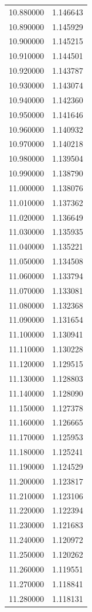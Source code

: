 \begin{tabular}{rr}
10.880000 & 1.146643 \\
10.890000 & 1.145929 \\
10.900000 & 1.145215 \\
10.910000 & 1.144501 \\
10.920000 & 1.143787 \\
10.930000 & 1.143074 \\
10.940000 & 1.142360 \\
10.950000 & 1.141646 \\
10.960000 & 1.140932 \\
10.970000 & 1.140218 \\
10.980000 & 1.139504 \\
10.990000 & 1.138790 \\
11.000000 & 1.138076 \\
11.010000 & 1.137362 \\
11.020000 & 1.136649 \\
11.030000 & 1.135935 \\
11.040000 & 1.135221 \\
11.050000 & 1.134508 \\
11.060000 & 1.133794 \\
11.070000 & 1.133081 \\
11.080000 & 1.132368 \\
11.090000 & 1.131654 \\
11.100000 & 1.130941 \\
11.110000 & 1.130228 \\
11.120000 & 1.129515 \\
11.130000 & 1.128803 \\
11.140000 & 1.128090 \\
11.150000 & 1.127378 \\
11.160000 & 1.126665 \\
11.170000 & 1.125953 \\
11.180000 & 1.125241 \\
11.190000 & 1.124529 \\
11.200000 & 1.123817 \\
11.210000 & 1.123106 \\
11.220000 & 1.122394 \\
11.230000 & 1.121683 \\
11.240000 & 1.120972 \\
11.250000 & 1.120262 \\
11.260000 & 1.119551 \\
11.270000 & 1.118841 \\
11.280000 & 1.118131 \\

\end{tabular}

